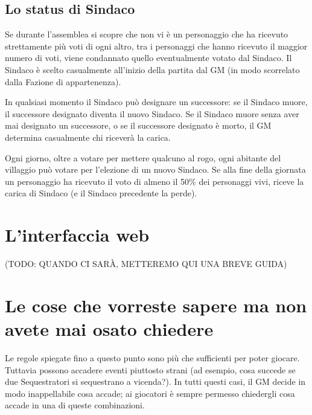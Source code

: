 \documentclass[a4paper,10pt]{article}
\begin{document}

\subsection{Lo status di Sindaco}
\label{sindaco}

Se durante l'assemblea si scopre che non vi è un personaggio che ha ricevuto strettamente più voti di ogni altro, tra i personaggi che hanno ricevuto il maggior numero di voti, viene condannato quello eventualmente votato dal Sindaco.
Il Sindaco è scelto casualmente all'inizio della partita dal GM (in modo scorrelato dalla Fazione di appartenenza).

In qualsiasi momento il Sindaco può designare un successore: se il Sindaco muore, il successore designato diventa il nuovo Sindaco. Se il Sindaco muore senza aver mai designato un successore, o se il successore designato è morto, il GM determina casualmente chi riceverà la carica.

Ogni giorno, oltre a votare per mettere qualcuno al rogo, ogni abitante del villaggio può votare per l'elezione di un nuovo Sindaco. Se alla fine della giornata un personaggio ha ricevuto il voto di almeno il 50\% dei personaggi vivi, riceve la carica di Sindaco (e il Sindaco precedente la perde).



\pagebreak
\section{L'interfaccia web}
(TODO: QUANDO CI SARÀ, METTEREMO QUI UNA BREVE GUIDA)



\section{Le cose che vorreste sapere ma non avete mai osato chiedere}
\label{faq}

Le regole spiegate fino a questo punto sono più che sufficienti per poter giocare. Tuttavia possono accadere eventi piuttosto strani (ad esempio, cosa succede se due Sequestratori si sequestrano a vicenda?). In tutti questi casi, il GM decide in modo inappellabile cosa accade; ai giocatori è sempre permesso chiedergli cosa accade in una di queste combinazioni.
\end{document}
